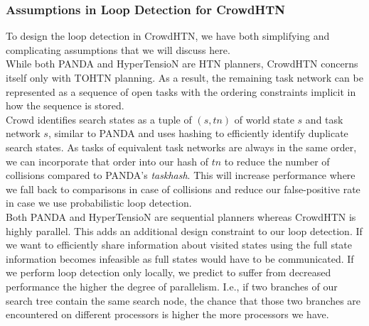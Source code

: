 \subsubsection{Assumptions in Loop Detection for CrowdHTN}
\label{ld - tohtn simplifications}
To design the loop detection in CrowdHTN, we have both simplifying and complicating assumptions that we will discuss here. \\
While both PANDA and HyperTensioN are HTN planners, CrowdHTN concerns itself only with TOHTN planning. As a result, the remaining task network can be represented as a sequence of open tasks with the ordering constraints implicit in how the sequence is stored.
 \\
Crowd identifies search states as a tuple of $(s, tn)$ of world state $s$ and task network $s$, similar to PANDA and uses hashing to efficiently identify duplicate search states. As tasks of equivalent task networks are always in the same order, we can incorporate that order into our hash of $tn$ to reduce the number of collisions compared to PANDA's \textit{taskhash}. This will increase performance where we fall back to comparisons in case of collisions and reduce our false-positive rate in case we use probabilistic loop detection. 
 \\
Both PANDA and HyperTensioN are sequential planners whereas CrowdHTN is highly parallel. This adds an additional design constraint to our loop detection. If we want to efficiently share information about visited states using the full state information becomes infeasible as full states would have to be communicated. If we perform loop detection only locally, we predict to suffer from decreased performance the higher the degree of parallelism. I.e., if two branches of our search tree contain the same search node, the chance that those two branches are encountered on different processors is higher the more processors we have.

\begin{comment}
	- keep the part where we store loop detection information externally
	- be sure we can always assume total order (and keep the ordering information to reduce false-positive rate!)
	- keep completeness of the planner
	- improve on the performance for hashing!
	- 
\end{comment}


